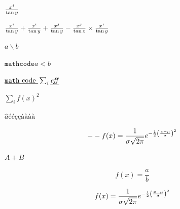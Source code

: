 \documentclass[fleqn]{minimal}
\begin{document}
\begin{preview}
${x^i}\over{\tan y}$
\end{preview}

\begin{preview}
${{x^i}\over{\tan y}} + \frac{x^i}{\tan y} + \frac{x^j}{\tan y} - \frac{x^j}{\tan z}
 \times \frac{x^i}{\tan y}$
\end{preview}

\begin{preview}
$a \backslash{} b$
\end{preview}

\begin{preview}
$\mathtt{math code} a < b$
\end{preview}

\begin{preview}
$\underline{\mathtt{math \hbox{ code }}} \sum_{i}{\underline{\mathit{eff}}}$
\end{preview}

\begin{preview}
$\sum_{i} f(x)^{2}$
\end{preview}

\begin{preview}
$\hat{a}ééççàààà$
\end{preview}

\begin{preview}

\[-- f(x) = {1 \over \sigma \sqrt{2\pi}}e^{-{1 \over 2}\left({x-\mu \over \sigma}\right)^2}
\]
\end{preview}

\begin{preview}
$A + B \label{anchor:in-math}%
$
\end{preview}

\begin{preview}

\[f(x) = \label{anchor:equal-point}%
\frac{a}{b} \]
\end{preview}

\begin{preview}

\[ f(x)
= {1\over\sigma\sqrt{2\pi}}
     e^{-{1\over2}\left({x-\mu\over\sigma}\right)^2}
\]
\end{preview}
\end{document}
